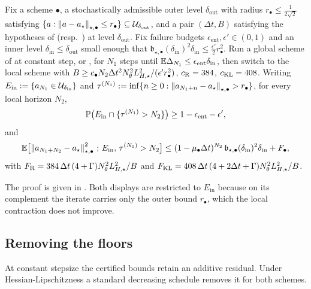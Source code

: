 \begin{corollary}
\label{cor:stoch-three-stage}
Fix a scheme $\bullet$, a stochastically admissible outer level $\delta_{\mathrm{out}}$ with radius
$r_\bullet\leq\tfrac1{2\sqrt2}$ satisfying
$\{a:\left\lVert a-a_\star\right\rVert_{\star,\bullet}\leq r_\bullet\}\subseteq\mathcal{U}_{\delta_{\mathrm{out}}}$, and a pair
$(\Delta t,B)$ satisfying the hypotheses of  (resp.\ )
at level $\delta_{\mathrm{out}}$. Fix failure budgets $\epsilon_{\mathrm{ent}},\epsilon'\in(0,1)$ and an
inner level $\delta_{\mathrm{in}}\leq\delta_{\mathrm{out}}$ small enough that
$\mathfrak b_{\star,\bullet}(\delta_{\mathrm{in}})^2\delta_{\mathrm{in}}\leq\tfrac{\epsilon'}2r_\bullet^2$.
Run a global scheme of  at constant step, or
, for $N_1$ steps until $\mathbb{E}\Delta_{N_1}\leq\epsilon_{\mathrm{ent}}\delta_{\mathrm{in}}$,
then switch to the local scheme with
$B\geq c_\bullet N_2\Delta t^2N_\theta^2L_{H,\star}^2/(\epsilon'r_\bullet^2)$, $c_{\mathrm{R}}=384$, $c_{\mathrm{KL}}=408$.
Writing $E_{\mathrm{in}}:=\{a_{N_1}\in\mathcal{U}_{\delta_{\mathrm{in}}}\}$ and
$\tau^{(N_1)}:=\inf\{n\geq0:\left\lVert a_{N_1+n}-a_\star\right\rVert_{\star,\bullet}>r_\bullet\}$, for every local
horizon $N_2$,
\[
    \mathbb{P}\bigl(E_{\mathrm{in}}\cap\{\tau^{(N_1)}>N_2\}\bigr)\geq1-\epsilon_{\mathrm{ent}}-\epsilon',
\]
and
\[
    \mathbb{E}\bigl[\left\lVert a_{N_1+N_2}-a_\star\right\rVert_{\star,\bullet}^2\,;\,E_{\mathrm{in}},\,\tau^{(N_1)}>N_2\bigr]
    \leq(1-\mu_\bullet\Delta t)^{N_2}\,\mathfrak b_{\star,\bullet}(\delta_{\mathrm{in}})^2\delta_{\mathrm{in}}
    +F_\bullet,
\]
with $F_{\mathrm{R}}=384\,\Delta t\,(4+\Gamma)N_\theta^2L_{H,\star}^2/B$ and
$F_{\mathrm{KL}}=408\,\Delta t\,(4+2\Delta t+\Gamma)N_\theta^2L_{H,\star}^2/B$.
\end{corollary}

The proof is given in . Both displays are restricted to $E_{\mathrm{in}}$
because on its complement the iterate carries only the outer bound $r_\bullet$, which the local
contraction does not improve.

\subsection{Removing the floors}
\label{subsec:stoch-nofloor}

At constant stepsize the certified bounds retain an additive residual. Under Hessian-Lipschitzness a
standard decreasing schedule removes it for both schemes.


